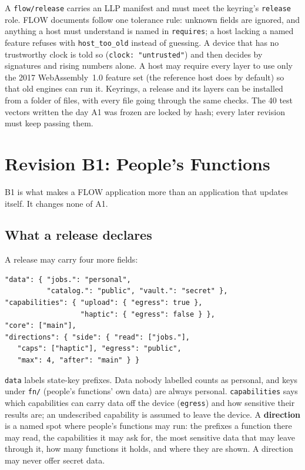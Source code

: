 \documentclass[10pt,twocolumn]{article}
\newcommand{\code}[1]{\texttt{#1}}
\begin{document}
A \code{flow/release} carries an LLP manifest and must meet the keyring's \code{release} role.
FLOW documents follow one tolerance rule: unknown fields are ignored, and anything a host must
understand is named in \code{requires}; a host lacking a named feature refuses with
\code{host\_too\_old} instead of guessing. A device that has no trustworthy clock is told so
(\code{clock: "untrusted"}) and then decides by signatures and rising numbers alone. A host may
require every layer to use only the 2017 WebAssembly~1.0 feature set (the reference host does by
default) so that old engines can run it. Keyrings, a release and its layers can be installed from a
folder of files, with every file going through the same checks. The 40 test vectors written the day
A1 was frozen are locked by hash; every later revision must keep passing them.

\section{Revision B1: People's Functions}
\label{sec:b1}

B1 is what makes a FLOW application more than an application that updates itself. It changes none
of A1.

\subsection{What a release declares}

A release may carry four more fields:
\begin{lstlisting}
"data": { "jobs.": "personal",
          "catalog.": "public", "vault.": "secret" },
"capabilities": { "upload": { "egress": true },
                  "haptic": { "egress": false } },
"core": ["main"],
"directions": { "side": { "read": ["jobs."],
   "caps": ["haptic"], "egress": "public",
   "max": 4, "after": "main" } }
\end{lstlisting}
\code{data} labels state-key prefixes. Data nobody labelled counts as personal, and keys under
\code{fn/} (people's functions' own data) are always personal. \code{capabilities} says which
capabilities can carry data off the device (\code{egress}) and how sensitive their results are; an
undescribed capability is assumed to leave the device. A \textbf{direction} is a named spot where
people's functions may run: the prefixes a function there may read, the capabilities it may ask for,
the most sensitive data that may leave through it, how many functions it holds, and where they are
shown. A direction may never offer secret data.
\end{document}
